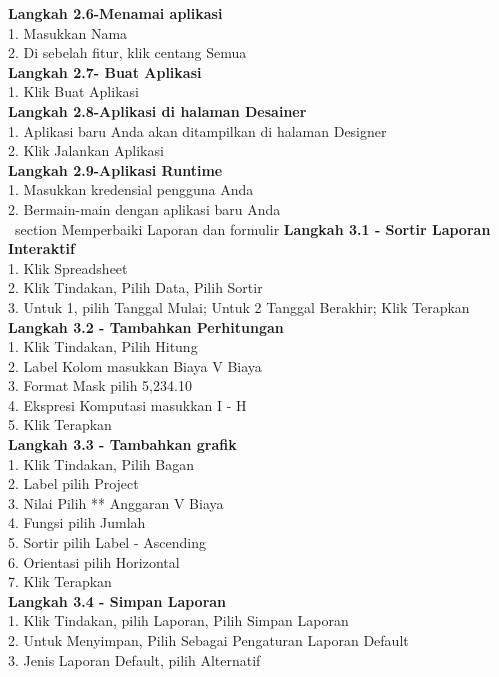 \documentclass [12pt, times new roman, a4paper]{article}
\begin{document}
\textbf{Langkah 2.6-Menamai aplikasi} \\
1. Masukkan Nama \\
2. Di sebelah fitur, klik centang Semua \\
\textbf{Langkah 2.7- Buat Aplikasi} \\
1. Klik Buat Aplikasi \\
\textbf{Langkah 2.8-Aplikasi di halaman Desainer} \\
1. Aplikasi baru Anda akan ditampilkan di halaman Designer \\
2. Klik Jalankan Aplikasi \\
\textbf{Langkah 2.9-Aplikasi Runtime} \\
1. Masukkan kredensial pengguna Anda \\
2. Bermain-main dengan aplikasi baru Anda \\
\ section {Memperbaiki Laporan dan formulir}
\textbf{Langkah 3.1 - Sortir Laporan Interaktif} \\
1. Klik Spreadsheet \\
2. Klik Tindakan, Pilih Data, Pilih Sortir \\
3. Untuk 1, pilih Tanggal Mulai; Untuk 2 Tanggal Berakhir; Klik Terapkan \\
\textbf{Langkah 3.2 - Tambahkan Perhitungan} \\
1. Klik Tindakan, Pilih Hitung \\
2. Label Kolom masukkan Biaya V Biaya \\
3. Format Mask pilih  5,234.10 \\
4. Ekspresi Komputasi masukkan I - H \\
5. Klik Terapkan \\
\textbf{Langkah 3.3 - Tambahkan grafik} \\
1. Klik Tindakan, Pilih Bagan \\
2. Label pilih Project \\
3. Nilai Pilih ** Anggaran V Biaya \\
4. Fungsi pilih Jumlah \\
5. Sortir pilih Label - Ascending \\
6. Orientasi pilih Horizontal \\
7. Klik Terapkan \\
\textbf{Langkah 3.4 - Simpan Laporan} \\
1. Klik Tindakan, pilih Laporan, Pilih Simpan Laporan \\
2. Untuk Menyimpan, Pilih Sebagai Pengaturan Laporan Default \\
3. Jenis Laporan Default, pilih Alternatif \\
\end{document}
